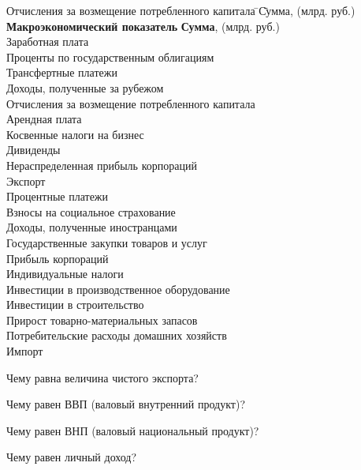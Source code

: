 \begin{tabbing}
Отчисления за возмещение потребленного капитала \qquad \=\qquad \= Сумма, \small{(млрд. руб.)}    \kill
\textbf{Макроэкономический показатель} \> \hspace{-25pt}\textbf{Сумма}, {\small(млрд. руб.)}\\
Заработная плата  \\
Проценты по государственным облигациям  \\
Трансфертные платежи  \\
Доходы, полученные за рубежом  \\
Отчисления за возмещение потребленного капитала  \\
Арендная плата  \\
Косвенные налоги на бизнес  \\
Дивиденды  \\
Нераспределенная прибыль корпораций  \\
Экспорт  \\
Процентные платежи  \\
Взносы на социальное страхование  \\
Доходы, полученные иностранцами  \\
Государственные закупки товаров и услуг  \\
Прибыль корпораций  \\
Индивидуальные налоги  \\
Инвестиции в производственное оборудование  \\
Инвестиции в строительство  \\
Прирост товарно-материальных запасов  \\
Потребительские расходы домашних хозяйств  \\
Импорт  
\end{tabbing}

\begin{list}{)}{\leftmargin=6mm  \topsep=0mm  \itemsep=0.3pt \parsep=0.06mm \itemindent=-1pt}
\item Чему равна величина чистого экспорта?
\item Чему равен ВВП (валовый внутренний продукт)? 
\item Чему равен ВНП (валовый национальный продукт)?
\item Чему равен личный доход?
\end{list}    
